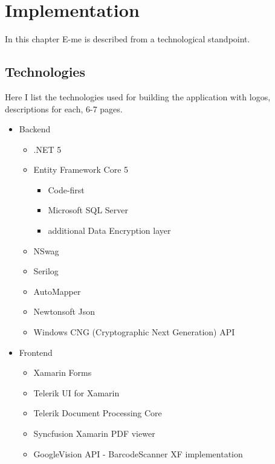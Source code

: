 \chapter{Implementation}\label{ch:IMPLEMENTATION}

\begin{summary}
	In this chapter E-me is described from a technological standpoint.
\end{summary}

\section{Technologies}
Here I list the technologies used for building the application with logos, descriptions for each, 6-7 pages.

\begin{itemize}
	\item Backend
	\begin{itemize}
		\item .NET 5
		\item Entity Framework Core 5
		\begin{itemize}
			\item Code-first
			\item Microsoft SQL Server
			\item additional Data Encryption layer
		\end{itemize}
		\item NSwag
		\item Serilog
		\item AutoMapper
		\item Newtonsoft Json
		\item Windows CNG (Cryptographic Next Generation) API
	\end{itemize}
	\item Frontend
	\begin{itemize}
		\item Xamarin Forms
		\item Telerik UI for Xamarin
		\item Telerik Document Processing Core
		\item Syncfusion Xamarin PDF viewer
		\item GoogleVision API - BarcodeScanner XF implementation
	\end{itemize}
\end{itemize}

